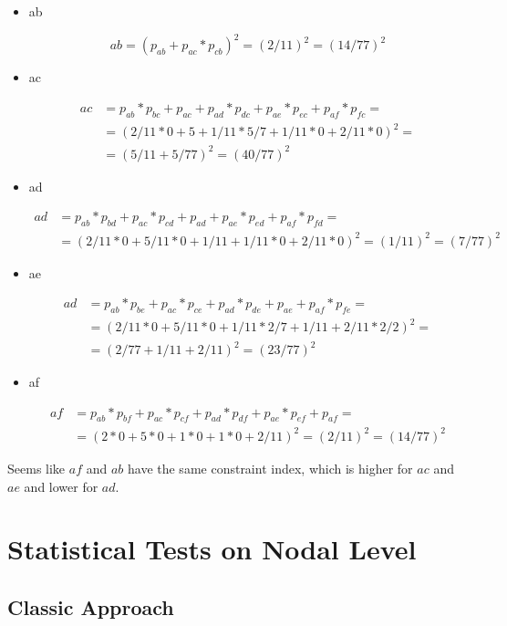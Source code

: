 \documentclass[
  notitlepage,
  onecolumn,
  openany]{book}
\begin{document}
\begin{itemize}
\item
  ab

  \[
    ab = (p_{ab}+p_{ac}* p_{cb})^2 =  (2/11)^2 = (14/77)^2
    \]
\item
  ac

  \[
    \begin{aligned}
    ac &= p_{ab}*p_{bc}+p_{ac}+p_{ad}*p_{dc}+p_{ae}*p_{ec}+p_{af}*p_{fc} =\\
    &= (2/11*0+5+1/11*5/7+1/11*0+2/11*0)^2= \\
    &= (5/11+5/77)^2 = (40/77)^2
    \end{aligned}
    \]
\item
  ad

  \[
    \begin{aligned}
    ad &= p_{ab}*p_{bd}+p_{ac}*p_{cd}+p_{ad}+p_{ae}*p_{ed}+p_{af}*p_{fd} =\\
    &= (2/11*0+5/11*0+1/11+1/11*0+2/11*0 )^2= (1/11)^2 = (7/77)^2
    \end{aligned}
    \]
\item
  ae

  \[
    \begin{aligned}
    ad &= p_{ab}*p_{be}+p_{ac}*p_{ce}+p_{ad}*p_{de}+p_{ae}+p_{af}*p_{fe} =\\
    &= (2/11*0+5/11*0+1/11*2/7+1/11+2/11*2/2)^2=\\
    &= (2/77+1/11+2/11) ^2 = (23/77)^2
    \end{aligned}
    \]
\item
  af

  \[
    \begin{aligned}
    af &= p_{ab}*p_{bf}+p_{ac}*p_{cf}+p_{ad}*p_{df}+p_{ae}*p_{ef}+p_{af}=\\
    &= (2*0+5*0+1*0+1*0+2/11)^2 = (2/11)^2 = (14/77)^2
    \end{aligned}
    \]
\end{itemize}

Seems like \(af\) and \(ab\) have the same constraint index, which is higher for \(ac\) and \(ae\) and lower for \(ad\).

\hypertarget{statistical-tests-on-nodal-level}{%
\chapter{Statistical Tests on Nodal Level}\label{statistical-tests-on-nodal-level}}

\hypertarget{classic-approach}{%
\section{Classic Approach}\label{classic-approach}}
\end{document}
